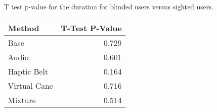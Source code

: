 
\centering
\caption{T test p-value for the duration for blinded users versus sighted users.}
\label{tab:ttest_duration}
\begin{tabular}{lr}
\toprule
      Method &  T-Test P-Value \\
\midrule
        Base &           0.729 \\
       Audio &           0.601 \\
 Haptic Belt &           0.164 \\
Virtual Cane &           0.716 \\
     Mixture &           0.514 \\
\bottomrule
\end{tabular}
